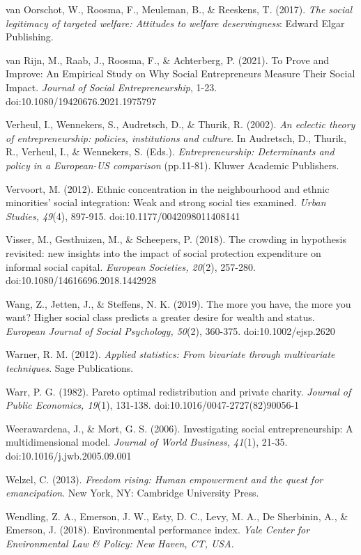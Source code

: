 \documentclass{article}
\begin{document}
van Oorschot, W., Roosma, F., Meuleman, B., \& Reeskens, T. (2017). \emph{The social legitimacy of targeted welfare: Attitudes to welfare deservingness}: Edward Elgar Publishing.

van Rijn, M., Raab, J., Roosma, F., \& Achterberg, P. (2021). To Prove and Improve: An Empirical Study on Why Social Entrepreneurs Measure Their Social Impact. \emph{Journal of Social Entrepreneurship}, 1-23. doi:10.1080/19420676.2021.1975797

Verheul, I., Wennekers, S., Audretsch, D., \& Thurik, R. (2002). \emph{An eclectic theory of entrepreneurship: policies, institutions and culture}. In Audretsch, D., Thurik, R., Verheul, I., \& Wennekers, S. (Eds.). \emph{Entrepreneurship: Determinants and policy in a European-US comparison} (pp.11-81). Kluwer Academic Publishers.

Vervoort, M. (2012). Ethnic concentration in the neighbourhood and ethnic minorities' social integration: Weak and strong social ties examined. \emph{Urban Studies, 49}(4), 897-915. doi:10.1177/0042098011408141

Visser, M., Gesthuizen, M., \& Scheepers, P. (2018). The crowding in hypothesis revisited: new insights into the impact of social protection expenditure on informal social capital. \emph{European Societies, 20}(2), 257-280. doi:10.1080/14616696.2018.1442928

Wang, Z., Jetten, J., \& Steffens, N. K. (2019). The more you have, the more you want? Higher social class predicts a greater desire for wealth and status. \emph{European Journal of Social Psychology, 50}(2), 360-375. doi:10.1002/ejsp.2620

Warner, R. M. (2012). \emph{Applied statistics: From bivariate through multivariate techniques}. Sage Publications.

Warr, P. G. (1982). Pareto optimal redistribution and private charity. \emph{Journal of Public Economics, 19}(1), 131-138. doi:10.1016/0047-2727(82)90056-1

Weerawardena, J., \& Mort, G. S. (2006). Investigating social entrepreneurship: A multidimensional model. \emph{Journal of World Business, 41}(1), 21-35. doi:10.1016/j.jwb.2005.09.001

Welzel, C. (2013). \emph{Freedom rising: Human empowerment and the quest for emancipation}. New York, NY: Cambridge University Press.

Wendling, Z. A., Emerson, J. W., Esty, D. C., Levy, M. A., De Sherbinin, A., \& Emerson, J. (2018). Environmental performance index. \emph{Yale }\emph{Center}\emph{ for Environmental Law \& Policy: New Haven, CT, USA}. 
\end{document}
